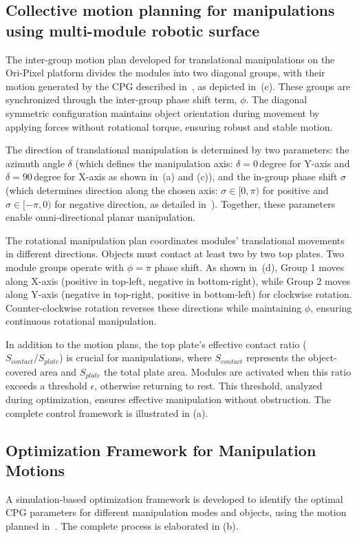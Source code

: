 \subsection{Collective motion planning for manipulations using multi-module robotic surface}
\label{sec:motion_plan}
The inter-group motion plan developed for translational manipulations on the Ori-Pixel platform divides the modules into two diagonal groups, with their motion generated by the CPG described in~, as depicted in~(c). These groups are synchronized through the inter-group phase shift term, $\phi$. The diagonal symmetric configuration maintains object orientation during movement by applying forces without rotational torque, ensuring robust and stable motion.

The direction of translational manipulation is determined by two parameters: the azimuth angle $\delta$ (which defines the manipulation axis: $\delta = 0$\,degree for Y-axis and $\delta=90$\,degree for X-axis as shown in~(a) and (c)), and the in-group phase shift $\sigma$ (which determines direction along the chosen axis: $\sigma \in [0, \pi)$ for positive and $\sigma \in [-\pi, 0)$ for negative direction, as detailed in~). Together, these parameters enable omni-directional planar manipulation.

The rotational manipulation plan coordinates modules' translational movements in different directions. Objects must contact at least two by two top plates. Two module groups operate with $\phi=\pi$ phase shift. As shown in~(d), Group 1 moves along X-axis (positive in top-left, negative in bottom-right), while Group 2 moves along Y-axis (negative in top-right, positive in bottom-left) for clockwise rotation. Counter-clockwise rotation reverses these directions while maintaining $\phi$, ensuring continuous rotational manipulation.

In addition to the motion plans, the top plate's effective contact ratio ($S_{\textit{contact}} / S_{\textit{plate}}$) is crucial for manipulations, where $S_{\textit{contact}}$ represents the object-covered area and $S_{\textit{plate}}$ the total plate area. Modules are activated when this ratio exceeds a threshold $\epsilon$, otherwise returning to rest. This threshold, analyzed during optimization, ensures effective manipulation without obstruction. The complete control framework is illustrated in (a).

\subsection{Optimization Framework for Manipulation Motions}
\label{sec:optimization}
A simulation-based optimization framework is developed to identify the optimal CPG parameters for different manipulation modes and objects, using the motion planned in~. The complete process is elaborated in (b).

